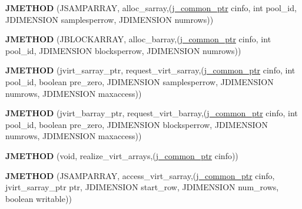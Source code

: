 \begin{DoxyCompactItemize}
{\bfseries J\+M\+E\+T\+H\+OD} (J\+S\+A\+M\+P\+A\+R\+R\+AY, alloc\+\_\+sarray,(\hyperlink{structjpeg__common__struct}{j\+\_\+common\+\_\+ptr} cinfo, int pool\+\_\+id, J\+D\+I\+M\+E\+N\+S\+I\+ON samplesperrow, J\+D\+I\+M\+E\+N\+S\+I\+ON numrows))
\item 
\mbox{\label{structjpeg__memory__mgr_aefc8abe884dab5648c1e4e7ada2e2e18}} 
{\bfseries J\+M\+E\+T\+H\+OD} (J\+B\+L\+O\+C\+K\+A\+R\+R\+AY, alloc\+\_\+barray,(\hyperlink{structjpeg__common__struct}{j\+\_\+common\+\_\+ptr} cinfo, int pool\+\_\+id, J\+D\+I\+M\+E\+N\+S\+I\+ON blocksperrow, J\+D\+I\+M\+E\+N\+S\+I\+ON numrows))
\item 
\mbox{\label{structjpeg__memory__mgr_a34b830d9d7b2f4fd043e98421a700503}} 
{\bfseries J\+M\+E\+T\+H\+OD} (jvirt\+\_\+sarray\+\_\+ptr, request\+\_\+virt\+\_\+sarray,(\hyperlink{structjpeg__common__struct}{j\+\_\+common\+\_\+ptr} cinfo, int pool\+\_\+id, boolean pre\+\_\+zero, J\+D\+I\+M\+E\+N\+S\+I\+ON samplesperrow, J\+D\+I\+M\+E\+N\+S\+I\+ON numrows, J\+D\+I\+M\+E\+N\+S\+I\+ON maxaccess))
\item 
\mbox{\label{structjpeg__memory__mgr_aee93326ad6a64714443e90044614d2a6}} 
{\bfseries J\+M\+E\+T\+H\+OD} (jvirt\+\_\+barray\+\_\+ptr, request\+\_\+virt\+\_\+barray,(\hyperlink{structjpeg__common__struct}{j\+\_\+common\+\_\+ptr} cinfo, int pool\+\_\+id, boolean pre\+\_\+zero, J\+D\+I\+M\+E\+N\+S\+I\+ON blocksperrow, J\+D\+I\+M\+E\+N\+S\+I\+ON numrows, J\+D\+I\+M\+E\+N\+S\+I\+ON maxaccess))
\item 
\mbox{\label{structjpeg__memory__mgr_a35cc0c3b3ecbc7209cdc23b2255932d8}} 
{\bfseries J\+M\+E\+T\+H\+OD} (void, realize\+\_\+virt\+\_\+arrays,(\hyperlink{structjpeg__common__struct}{j\+\_\+common\+\_\+ptr} cinfo))
\item 
\mbox{\label{structjpeg__memory__mgr_a747ad4316a4794b13f9fdff4f6f699ca}} 
{\bfseries J\+M\+E\+T\+H\+OD} (J\+S\+A\+M\+P\+A\+R\+R\+AY, access\+\_\+virt\+\_\+sarray,(\hyperlink{structjpeg__common__struct}{j\+\_\+common\+\_\+ptr} cinfo, jvirt\+\_\+sarray\+\_\+ptr ptr, J\+D\+I\+M\+E\+N\+S\+I\+ON start\+\_\+row, J\+D\+I\+M\+E\+N\+S\+I\+ON num\+\_\+rows, boolean writable))
\item 
\mbox{\label{structjpeg__memory__mgr_aa460f4b500825e051306b8ce5583d052}} 

\end{DoxyCompactItemize}
